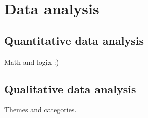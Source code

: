 \section{Data analysis}

\subsection{Quantitative data analysis}
Math and logix :)


\subsection{Qualitative data analysis}
Themes and categories.